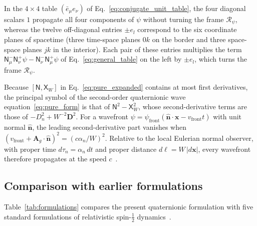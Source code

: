 \documentclass[aps,prd,onecolumn,tightenlines,nofootinbib,notitlepage,11pt,floatfix]{revtex4-2}
\theoremstyle{indentedtheorem}
\begin{document}
In the $4\times 4$ table $(\bar{e}_\mu e_\nu)$ of Eq.~\eqref{eq:conjugate_unit_table}, the four diagonal scalars $1$ propagate all four components of $\psi$ without turning the frame $\mathcal{R}_\psi$, whereas the twelve off-diagonal entries $\pm e_l$ correspond to the six coordinate planes of spacetime (three time-space planes $0k$ on the border and three space-space planes $jk$ in the interior). Each pair of these entries multiplies the term $\mathsf{N}_\mu^-\mathsf{N}_\nu^+\psi - \mathsf{N}_\nu^-\mathsf{N}_\mu^+\psi$ of Eq.~\eqref{eq:general_table} on the left by $\pm e_l$, which turns the frame $\mathcal{R}_\psi$.

Because $[\mathsf{N},\mathsf{X}_W]$ in Eq.~\eqref{eq:pure_expanded} contains at most first derivatives, the principal symbol of the second-order quaternionic wave equation~\eqref{eq:pure_form} is that of $\mathsf{N}^2 - \mathsf{X}_W^2$, whose second-derivative terms are those of $-D_n^2 + W^{-2}\mathbf{D}^2$. For a wavefront $\psi = \psi_\text{front}(\hat{\mathbf{n}}\cdot\mathbf{x} - v_\text{front}t)$ with unit normal $\hat{\mathbf{n}}$, the leading second-derivative part vanishes when $(v_\text{front} + \mathbf{A}_g\cdot\hat{\mathbf{n}})^2 = (c\alpha_n/W)^2$. Relative to the local Eulerian normal observer, with proper time $d\tau_n = \alpha_n\,dt$ and proper distance $d\ell = W\,|d\mathbf{x}|$, every wavefront therefore propagates at the speed $c$~\citep{Thaller1992Dirac}.

\subsection{Comparison with earlier formulations}
\label{sec:extensions}

Table~\ref{tab:formulations} compares the present quaternionic formulation with five standard formulations of relativistic spin-$\tfrac{1}{2}$ dynamics~\citep{Dirac1928Quantum,Foldy1950Dirac,Eriksen1958Foldy,Silenko2008Foldy,FeynmanGellMann1958Theory,Hestenes1967Real,Hestenes1990Zitterbewegung,LasenbyDoranGull1998Gravity,Lanczos1929Tensoranalytischen,DeLeoRotelli1994Translations,DeLeoRodrigues1998Quaternionic,GsponerHurni2002Heritage,ObukhovSilenkoTeryaev2009Spin,ObukhovSilenkoTeryaev2011Dirac,ObukhovSilenkoTeryaev2013Spin}.
\end{document}
